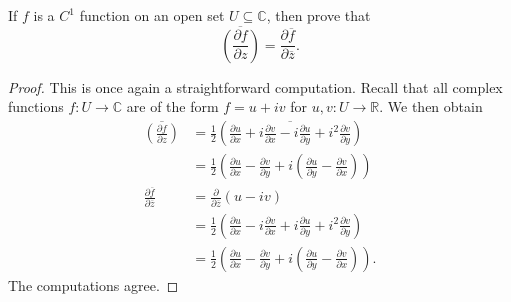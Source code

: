 \documentclass[11pt, letterpaper]{article}
\begin{document}
\begin{problem}
	If $f$ is a $C^1$ function on an open set $U\subseteq \mathbb{C} $, then prove that
	\[
		\overline{\left(\frac{\partial f}{\partial z} \right)} =\frac{\partial \overline{f} }{\partial \overline{z} } 
	.\]
\end{problem}
\begin{proof}
	This is once again a straightforward computation. Recall that all complex functions $f : U \to \mathbb{C} $ are of the form $f=u+iv$ for $u,v : U \to \mathbb{R} $. We then obtain
	\begin{align*}
		\overline{\left( \frac{\partial f}{\partial z}  \right) } &= \frac{1}{2}\left( \overline{\frac{\partial u}{\partial x} +i \frac{\partial v}{\partial x} -i \frac{\partial u}{\partial y} +i^2 \frac{\partial v}{\partial y} } \right)\\
									  &=\frac{1}{2} \left( \frac{\partial u}{\partial x} -\frac{\partial v}{\partial y} +i\left( \frac{\partial u}{\partial y} -\frac{\partial v}{\partial x}  \right)  \right) \\
									  \frac{\partial \overline{f} }{\partial \overline{z} } &= \frac{\partial }{\partial \overline{z} } \left( u-iv \right) \\
																&=\frac{1}{2} \left( \frac{\partial u}{\partial x} -i \frac{\partial v}{\partial x} +i \frac{\partial u}{\partial y} +i^2 \frac{\partial v}{\partial y}  \right) \\
																&=\frac{1}{2} \left( \frac{\partial u}{\partial x} -\frac{\partial v}{\partial y} +i\left( \frac{\partial u}{\partial y} -\frac{\partial v}{\partial x}  \right)  \right) 
	.\end{align*}
	The computations agree.
\end{proof}
\end{document}
